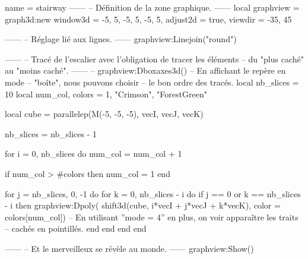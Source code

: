 \documentclass[border = 3pt]{standalone}
\begin{document}
\begin{luadraw}{name = stairway}
------
-- Définition de la zone graphique.
------
    local graphview = graph3d:new{
        window3d = {-5, 5, -5, 5, -5, 5},
        adjust2d = true,
        viewdir  = {-35, 45}
    }

------
-- Réglage lié aux lignes.
------
    graphview:Linejoin("round")

------
-- Tracé de l'escalier avec l'obligation de tracer les éléments
-- du "plus caché" au "moins caché".
------
--    graphview:Dboxaxes3d()  -- En affichant le repère en mode
                              -- "boîte", nous pouvons choisir
                              -- le bon ordre des tracés.
    local nb_slices = 10
    local num_col, colors = 1, {"Crimson", "ForestGreen"}

    local cube = parallelep(M(-5, -5, -5), vecI, vecJ, vecK)

	nb_slices = nb_slices - 1

    for i = 0, nb_slices do
        num_col = num_col + 1

        if num_col > #colors then
            num_col = 1
        end

        for j = nb_slices, 0, -1 do
            for k = 0, nb_slices - i do
                if j == 0 or k == nb_slices - i then
                    graphview:Dpoly(
                        shift3d(cube, i*vecI + j*vecJ + k*vecK),
                        {color = colors[num_col]})
-- En utilisant ''mode = 4'' en plus, on voir apparaître les traits
-- cachés en pointillés.
                end
            end
        end
    end

------
-- Et le merveilleux se révèle au monde.
------
    graphview:Show()
\end{luadraw}
\end{document}
